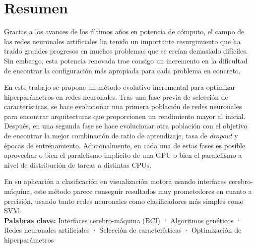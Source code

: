 \begingroup
\let\cleardoublepage\relax
\let\cleardoublepage\relax

\chapter*{Resumen}

Gracias a los avances de los últimos años en potencia de cómputo, el campo de las redes neuronales artificiales ha tenido un importante resurgimiento que ha traído grandes progresos en muchos problemas que se creían demasiado difíciles. Sin embargo, esta potencia renovada trae consigo un incremento en la dificultad de encontrar la configuración más apropiada para cada problema en concreto.

En este trabajo se propone un método evolutivo incremental para optimizar hiperparámetros en redes neuronales. Tras una fase previa de selección de características, se hace evolucionar una primera población de redes neuronales para encontrar arquitecturas que proporcionen un rendimiento mayor al inicial. Después, en una segunda fase se hace evolucionar otra población con el objetivo de encontrar la mejor combinación de ratio de aprendizaje, tasa de \textit{dropout} y épocas de entrenamiento. Adicionalmente, en cada una de estas fases es posible aprovechar o bien el paralelismo implícito de una GPU o bien el paralelismo a nivel de distribución de tareas a distintas CPUs.

En su aplicación a clasificación en visualización motora usando interfaces cerebro-máquina, este método parece conseguir resultados muy prometedores en cuanto a precisión, usando tanto redes neuronales como clasificadores más simples como SVM.\\

\textbf{Palabras clave:} Interfaces cerebro-máquina (BCI) · Algoritmos genéticos · Redes neuronales artificiales · Selección de características · Optimización de hiperparámetros